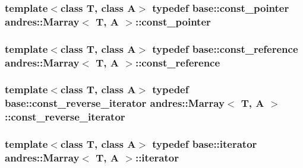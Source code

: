 \subsubsection[{const\+\_\+pointer}]{\setlength{\rightskip}{0pt plus 5cm}template$<$class T, class A$>$ typedef {\bf base\+::const\+\_\+pointer} {\bf andres\+::\+Marray}$<$ T, A $>$\+::{\bf const\+\_\+pointer}}\label{classandres_1_1Marray_a6e9d79616cdeed14221d96431ab5f678}
\hypertarget{classandres_1_1Marray_ae5ecc2e9f1b747ffaaff04ab15568783}{}
\subsubsection[{const\+\_\+reference}]{\setlength{\rightskip}{0pt plus 5cm}template$<$class T, class A$>$ typedef {\bf base\+::const\+\_\+reference} {\bf andres\+::\+Marray}$<$ T, A $>$\+::{\bf const\+\_\+reference}}\label{classandres_1_1Marray_ae5ecc2e9f1b747ffaaff04ab15568783}
\hypertarget{classandres_1_1Marray_a03aa08b455a9fcb7c3ba9072799cad92}{}
\subsubsection[{const\+\_\+reverse\+\_\+iterator}]{\setlength{\rightskip}{0pt plus 5cm}template$<$class T, class A$>$ typedef {\bf base\+::const\+\_\+reverse\+\_\+iterator} {\bf andres\+::\+Marray}$<$ T, A $>$\+::{\bf const\+\_\+reverse\+\_\+iterator}}\label{classandres_1_1Marray_a03aa08b455a9fcb7c3ba9072799cad92}
\hypertarget{classandres_1_1Marray_afa294c08fe2bf282f9c3b65ac8da1622}{}
\subsubsection[{iterator}]{\setlength{\rightskip}{0pt plus 5cm}template$<$class T, class A$>$ typedef {\bf base\+::iterator} {\bf andres\+::\+Marray}$<$ T, A $>$\+::{\bf iterator}}\label{classandres_1_1Marray_afa294c08fe2bf282f9c3b65ac8da1622}
\hypertarget{classandres_1_1Marray_a42f16cbe0ebc93347dd9eed78484e951}{}
